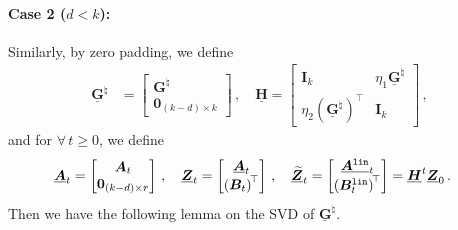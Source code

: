 \paragraph{Case 2 ($d<k$):} Similarly, by zero padding, we define
\begin{align*}
    \underline{\mathbf{G}}^\natural & = \begin{bmatrix}
        {\bm G}^{\natural} \\ \bm 0_{(k-d) \times k}
    \end{bmatrix}\,,\quad \underline{\bm H} = \begin{bmatrix}
        \bm I_k & \eta_1 \underline{\mathbf{G}}^\natural\\
        \eta_2 \left(\underline{\mathbf{G}}^\natural\right)^{\!\top} & \bm I_k
    \end{bmatrix}\,,
\end{align*}
and for $\forall\,t\geq 0$, we define
\begin{align*}
    \underline{\bm A}_t & = \begin{bmatrix}
        \bm A_t \\ \bm 0_{(k-d)\times r}
    \end{bmatrix}\,,\quad \underline{\bm Z}_t = \begin{bmatrix}
        \underline{\bm A}_t \\ \left(\bm B_t\right)^{\!\top}
    \end{bmatrix}\,,\quad \underline{\widetilde{\bm Z}}_t = \begin{bmatrix}
        \underline{\bm A^{\tt lin}}_t\\
        \left(\bm B^{\tt lin}_t\right)^{\!\top}
    \end{bmatrix} = \underline{\bm H}^t \underline{\bm Z}_0\,.
\end{align*}
Then we have the following lemma on the SVD of $\underline{\mathbf{G}}^\natural$.
